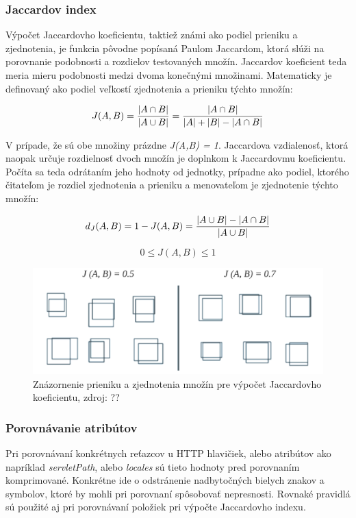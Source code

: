 \documentclass[
  digital, %
  table,   %
  lof,     %
  nolot,   %
  nocover
]{fithesis3}
\begin{document}
\subsubsection{Jaccardov index}
Výpočet Jaccardovho koeficientu, taktiež známi ako podiel prieniku a 
zjednotenia, je funkcia pôvodne popísaná Paulom Jaccardom, ktorá slúži na
porovnanie podobnosti a rozdielov testovaných množín. Jaccardov koeficient teda
meria mieru podobnosti medzi dvoma konečnými množinami. Matematicky je
definovaný ako podiel veľkostí zjednotenia a prieniku týchto množín:

\begin{equation}
 J(A,B) = {{|A \cap B|}\over{|A \cup B|}} = {{|A \cap B|}\over{|A| + |B| - |A \cap B|}}
\end{equation}

V prípade, že sú obe množiny prázdne \textit{J(A,B) = 1}.
Jaccardova vzdialenosť, ktorá naopak určuje rozdielnosť dvoch množín je
doplnkom k Jaccardovmu koeficientu. Počíta sa teda odrátaním jeho hodnoty od
jednotky, prípadne ako podiel, ktorého čitateľom je rozdiel zjednotenia a
prieniku a menovateľom je zjednotenie týchto množín:

\begin{equation}
 d_J(A,B) = 1 - J(A,B) = { { |A \cup B| - |A \cap B| } \over |A \cup B| }
\end{equation}

\begin{equation}
 0\le J(A,B)\le 1
\end{equation}

\begin{figure}[h]
  \centering
    \includegraphics[width=.99\textwidth]{images/footprint-jacc-sets.png}
  \caption{Znázornenie prieniku a zjednotenia množín pre výpočet Jaccardovho
  koeficientu, zdroj: ??}
  \label{fig:footprint-jacc-sets}
\end{figure}

\subsubsection{Porovnávanie atribútov}
Pri porovnávaní konkrétnych reťazcov u HTTP hlavičiek, alebo atribútov ako
napríklad \textit{servletPath}, alebo \textit{locales} sú tieto hodnoty pred
porovnaním komprimované. Konkrétne ide o odstránenie nadbytočných bielych
znakov a symbolov, ktoré by mohli pri porovnaní spôsobovať nepresnosti. Rovnaké
pravidlá sú použité aj pri porovnávaní položiek pri výpočte Jaccardovho indexu.
\end{document}
